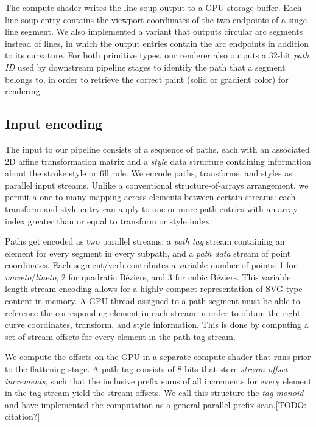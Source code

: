 \documentclass[sigconf, authordraft]{acmart}
\begin{document}
The compute shader writes the line soup output to a GPU storage buffer. Each line soup entry contains the viewport coordinates of the two endpoints of a singe line segment. We also implemented a variant that outputs circular arc segments instead of lines, in which the output entries contain the arc endpoints in addition to its curvature. For both primitive types, our renderer also outputs a 32-bit \emph{path ID} used by downstream pipeline stages to identify the path that a segment belongs to, in order to retrieve the correct paint (solid or gradient color) for rendering.

\subsection{Input encoding}

The input to our pipeline consists of a sequence of paths, each with an associated 2D affine transformation matrix and a \emph{style} data structure containing information about the stroke style or fill rule. We encode paths, transforms, and styles as parallel input streams. Unlike a conventional structure-of-arrays arrangement, we permit a one-to-many mapping across elements between certain streams: each transform and style entry can apply to one or more path entries with an array index greater than or equal to transform or style index.

Paths get encoded as two parallel streams: a \emph{path tag} stream containing an element for every segment in every subpath, and a \emph{path data} stream of point coordinates. Each segment/verb contributes a variable number of points: 1 for \emph{moveto}/\emph{lineto}, 2 for quadratic Béziers, and 3 for cubic Béziers. This variable length stream encoding allows for a highly compact representation of SVG-type content in memory. A GPU thread assigned to a path segment must be able to reference the corresponding element in each stream in order to obtain the right curve coordinates, transform, and style information. This is done by computing a set of stream offsets for every element in the path tag stream.


We compute the offsets on the GPU in a separate compute shader that runs prior to the flattening stage. A path tag consists of 8 bits that store \emph{stream offset increments}, such that the inclusive prefix sums of all increments for every element in the tag stream yield the stream offsets. We call this structure the \emph{tag monoid} and have implemented the computation as a general parallel prefix scan.[TODO: citation?]
\end{document}
